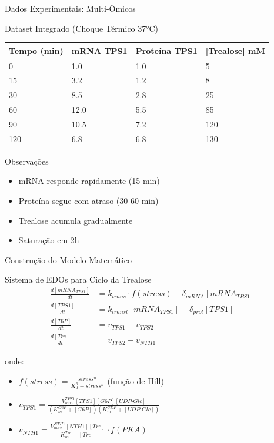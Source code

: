 \begin{frame}{Dados Experimentais: Multi-Ômicos}
\begin{block}{Dataset Integrado (Choque Térmico 37°C)}
\begin{center}
\begin{tabular}{llll}
\toprule
\textbf{Tempo (min)} & \textbf{mRNA TPS1} & \textbf{Proteína TPS1} & \textbf{[Trealose] mM} \\
\midrule
0 & 1.0 & 1.0 & 5 \\
15 & 3.2 & 1.2 & 8 \\
30 & 8.5 & 2.8 & 25 \\
60 & 12.0 & 5.5 & 85 \\
90 & 10.5 & 7.2 & 120 \\
120 & 6.8 & 6.8 & 130 \\
\bottomrule
\end{tabular}
\end{center}
\end{block}

\vspace{0.2cm}

\begin{exampleblock}{Observações}
\begin{itemize}
    \item mRNA responde rapidamente (15 min)
    \item Proteína segue com atraso (30-60 min)
    \item Trealose acumula gradualmente
    \item Saturação em 2h
\end{itemize}
\end{exampleblock}
\end{frame}

\begin{frame}{Construção do Modelo Matemático}
\begin{block}{Sistema de EDOs para Ciclo da Trealose}
\begin{align*}
\frac{d[mRNA_{TPS1}]}{dt} &= k_{trans} \cdot f(stress) - \delta_{mRNA}[mRNA_{TPS1}] \\
\frac{d[TPS1]}{dt} &= k_{transl}[mRNA_{TPS1}] - \delta_{prot}[TPS1] \\
\frac{d[T6P]}{dt} &= v_{TPS1} - v_{TPS2} \\
\frac{d[Tre]}{dt} &= v_{TPS2} - v_{NTH1}
\end{align*}

onde:
\begin{itemize}
    \item $f(stress) = \frac{stress^n}{K_d^n + stress^n}$ (função de Hill)
    \item $v_{TPS1} = \frac{V_{max}^{TPS1}[TPS1][G6P][UDP\text{-}Glc]}{(K_m^{G6P} + [G6P])(K_m^{UDP} + [UDP\text{-}Glc])}$
    \item $v_{NTH1} = \frac{V_{max}^{NTH1}[NTH1][Tre]}{K_m^{Tre} + [Tre]} \cdot f(PKA)$
\end{itemize}
\end{block}
\end{frame}

